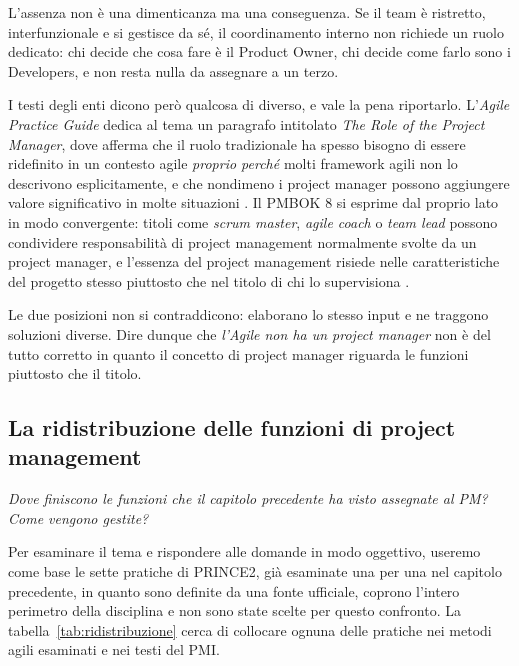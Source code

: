 L'assenza non \`e una dimenticanza ma una conseguenza. Se il team \`e ristretto,
interfunzionale e si gestisce da s\'e, il coordinamento interno non richiede un
ruolo dedicato: chi decide che cosa fare \`e il Product Owner, chi decide come
farlo sono i Developers, e non resta nulla da assegnare a un terzo.

I testi degli enti dicono per\`o qualcosa di diverso, e vale la pena riportarlo.
L'\emph{Agile Practice Guide} dedica al tema un paragrafo
intitolato \emph{The Role of the Project Manager}, dove afferma che il ruolo
tradizionale ha spesso bisogno di essere ridefinito in un contesto agile
\emph{proprio perch\'e} molti framework agili non lo descrivono
esplicitamente, e che nondimeno i project manager possono aggiungere valore
significativo in molte situazioni \cite{agilepracticeguide2}. Il PMBOK 8 si
esprime dal proprio lato in modo convergente: titoli come \emph{scrum master},
\emph{agile coach} o \emph{team lead} possono condividere responsabilit\`a di
project management normalmente svolte da un project manager, e l'essenza del
project management risiede nelle caratteristiche del progetto stesso piuttosto
che nel titolo di chi lo supervisiona \cite{pmbok8}.

Le due posizioni non si contraddicono: elaborano lo stesso input e ne traggono
soluzioni diverse. Dire dunque che \emph{l'Agile non ha un project
manager} non \`e del tutto corretto in quanto il concetto di project manager
riguarda le funzioni piuttosto che il titolo.

\subsection{La ridistribuzione delle funzioni di project management}

\emph{Dove finiscono le funzioni che il capitolo precedente ha visto assegnate al PM?}
\emph{Come vengono gestite?}

Per esaminare il tema e rispondere alle domande in modo oggettivo, useremo come base le sette
pratiche di PRINCE2, gi\`a esaminate una per una nel capitolo precedente, in quanto
sono definite da una fonte ufficiale, coprono l'intero
perimetro della disciplina e non sono state scelte per questo confronto. La
tabella~\ref{tab:ridistribuzione} cerca di collocare ognuna delle pratiche
nei metodi agili esaminati e nei testi del PMI.

